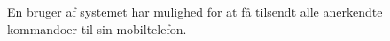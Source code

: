 En bruger af systemet har mulighed for at få tilsendt alle anerkendte kommandoer til sin mobiltelefon.




